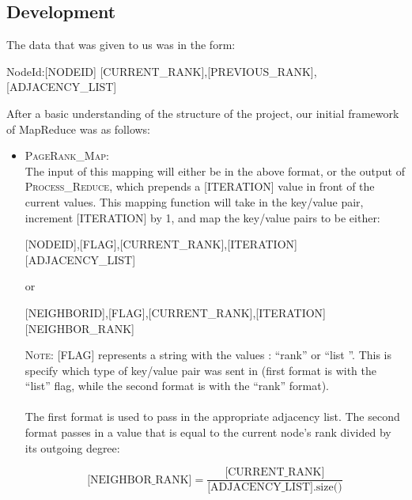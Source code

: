 \subsection*{Development}
The data that was given to us was in the form: 
{
\begin{center}
NodeId:[NODEID] \hspace{8mm} [CURRENT\_RANK],[PREVIOUS\_RANK],[ADJACENCY\_LIST]
\end{center}
}
\noindent After a basic understanding of the structure of the project, our initial framework of MapReduce was as follows:
    \begin{itemize}
        \item \textsc{PageRank\_Map}: \\
        The input of this mapping will either be in the above format, or the output of \textsc{Process\_Reduce}, which prepends a [ITERATION] value in front of the current values. This mapping function will take in the key/value pair, increment [ITERATION] by 1, and map the key/value pairs to be either:
        \begin{center}
        [NODEID],[FLAG],[CURRENT\_RANK],[ITERATION] \hspace{8mm} [ADJACENCY\_LIST]
        \end{center}
        or
        \begin{center}
        [NEIGHBORID],[FLAG],[CURRENT\_RANK],[ITERATION] \hspace{8mm} [NEIGHBOR\_RANK]
        \end{center}

        \textsc{Note:} [FLAG] represents a string with the values : ``rank'' or ``list
        ''. This is specify which type of key/value pair was sent in (first format is with the ``list'' flag, while the second format is with the ``rank'' format).  
        \\ \\
        \noindent The first format is used to pass in the appropriate adjacency list. The second format passes in a value that is equal to the current node's rank divided by its outgoing degree:

        $$\text{[NEIGHBOR\_RANK]} = \frac{\text{[CURRENT\_RANK]}}{\text{[ADJACENCY\_LIST].size()}}$$


\end{itemize}
